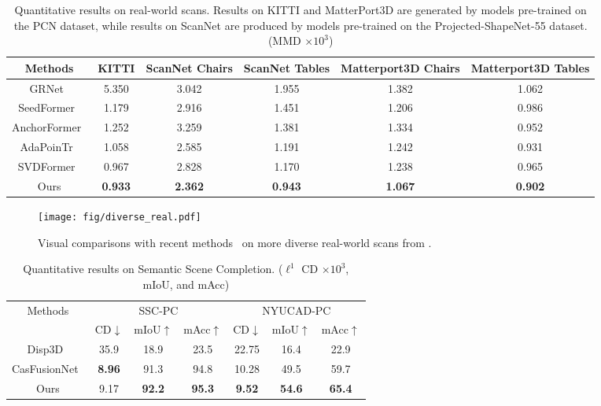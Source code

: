 \begin{table*}
    \renewcommand\arraystretch{1.2}
    \small
    \centering
    \caption{Quantitative results on real-world scans. Results on KITTI and MatterPort3D are generated by models pre-trained on the PCN dataset, while results on ScanNet are produced by models pre-trained on the Projected-ShapeNet-55 dataset. (MMD $\times 10^3$)}
    \label{tab:realworld}
    \begin{tabular}{|c|c|c|c|c|c|}
    \hline
    Methods & KITTI & ScanNet Chairs & ScanNet Tables & Matterport3D Chairs & Matterport3D Tables \\
    \hline
              GRNet~\citep{xie2020grnet}   & 5.350 & 3.042 & 1.955 & 1.382 & 1.062 \\
              SeedFormer~\citep{zhou2022seedformer}   & 1.179 & 2.916 & 1.451 & 1.206 & 0.986 \\
              AnchorFormer~\citep{chen2023anchorformer} & 1.252 & 3.259 & 1.381 & 1.334 & 0.952 \\
              AdaPoinTr~\citep{10232862}   & 1.058  & 2.585 & 1.191 & 1.242 & 0.931  \\
              SVDFormer~\citep{Zhu_2023_ICCV}   & 0.967 & 2.828 & 1.170 & 1.238 & 0.965 \\
              Ours   & \textbf{0.933}  & \textbf{2.362} & \textbf{0.943} & \textbf{1.067} & \textbf{0.902} \\
    \hline
    \end{tabular}
\end{table*}

\begin{figure}[h]
  \centering
  \texttt{[image: fig/diverse\_real.pdf]}
\caption{Visual comparisons with recent methods~\citep{chen2023anchorformer,10232862} on more diverse real-world scans from \cite{dai2017scannet,choi2016large}.}
  \label{fig:diverse_real}
\end{figure}

\begin{table*}[h]
    \renewcommand\arraystretch{1.1}
    \centering
    \caption{Quantitative results on Semantic Scene Completion. ({$\displaystyle \ell ^{1}$} CD $\times 10^3$, mIoU, and mAcc)}
    \small
    \label{tab:ssc}
    \begin{tabular}{|c|ccc|ccc|}
    \hline
    \multirow{2}{*}{Methods} &  \multicolumn{3}{c|}{SSC-PC} & \multicolumn{3}{c|}{NYUCAD-PC} \\\cline{2-7} & CD$\downarrow$ & mIoU$\uparrow$ & mAcc$\uparrow$ & CD$\downarrow$ & mIoU$\uparrow$ & mAcc$\uparrow$ \\
    \hline
    Disp3D~\citep{wang2022learning} & 35.9 & 18.9 & 23.5 & 22.75 & 16.4 & 22.9 \\
    CasFusionNet~\citep{xu2023casfusionnet} & \textbf{8.96} & 91.3 & 94.8 & 10.28 & 49.5 & 59.7 \\
    \hline
    Ours &  9.17 & \textbf{92.2} & \textbf{95.3} & \textbf{9.52} & \textbf{54.6} & \textbf{65.4} \\
    \hline
    \end{tabular}
\end{table*}

